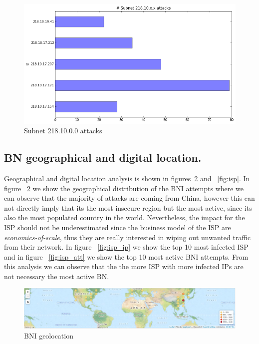 \begin{figure}[h]
    \caption{Subnet 218.10.0.0 attacks}
    \label{fig:subnet}
    \centering
    \includegraphics[width=0.9\linewidth]{images/subnet}
\end{figure}

\subsection{BN geographical and digital location.}
Geographical and digital location analysis is shown in figures~\ref{fig:map} and ~\ref{fig:isp}. In figure ~\ref{fig:map} we show the geographical distribution of the BNI attempts where we can observe that the majority of attacks are coming from China, however this can not directly imply that its the most insecure region but the most active, since its also the most populated country in the world. Nevertheless, the impact for the ISP should not be underestimated since the business model of the ISP are \textit{economics-of-scale}, thus they are really interested in wiping out unwanted traffic from their network. In figure ~\ref{fig:isp_ip} we show the top 10 most infected ISP and in figure ~\ref{fig:isp_att} we show the top 10 most active BNI attempts. From this analysis we can observe that the the more ISP with more infected IPs are not necessary the most active BN.
\begin{figure}[ht]

\caption{BNI geolocation~\cite{map}}
\label{fig:map}
\centering
    \includegraphics[width=0.9\linewidth]{images/map}
\end{figure}



